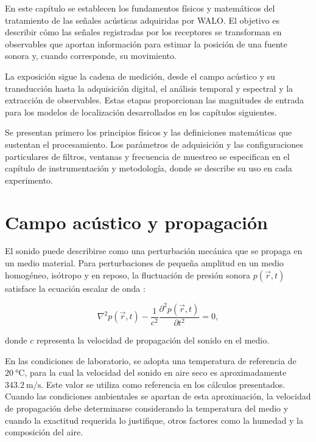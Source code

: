 \label{chap:tratamiento_campo}


En este capítulo se establecen los fundamentos físicos y matemáticos del
tratamiento de las señales acústicas adquiridas por WALO. El objetivo es
describir cómo las señales registradas por los receptores se transforman
en observables que aportan información para estimar la posición de una
fuente sonora y, cuando corresponde, su movimiento.

La exposición sigue la cadena de medición, desde el campo acústico y su
transducción hasta la adquisición digital, el análisis temporal y
espectral y la extracción de observables. Estas etapas proporcionan las
magnitudes de entrada para los modelos de localización desarrollados en
los capítulos siguientes.

Se presentan primero los principios físicos y las definiciones
matemáticas que sustentan el procesamiento. Los parámetros de adquisición
y las configuraciones particulares de filtros, ventanas y frecuencia de
muestreo se especifican en el capítulo de instrumentación y metodología,
donde se describe su uso en cada experimento.

\section{Campo acústico y propagación}

El sonido puede describirse como una perturbación mecánica que se propaga
en un medio material. Para perturbaciones de pequeña amplitud en un medio
homogéneo, isótropo y en reposo, la fluctuación de presión sonora
$p(\vec{r},t)$ satisface la ecuación escalar de onda
\cite{kinsler2000fundamentals,morse1968theoretical,pierce1989acoustics}:

\begin{equation}
    \nabla^2 p(\vec{r},t)
    -
    \frac{1}{c^2}
    \frac{\partial^2 p(\vec{r},t)}{\partial t^2}
    =0,
    \label{eq:onda_acustica}
\end{equation}

donde $c$ representa la velocidad de propagación del sonido en el medio.

En las condiciones de laboratorio, se adopta una temperatura de
referencia de $\SI{20}{\celsius}$, para la cual la velocidad del
sonido en aire seco es aproximadamente
$\SI{343.2}{\metre\per\second}$. Este valor se utiliza como
referencia en los cálculos presentados. Cuando las condiciones
ambientales se apartan de esta aproximación, la velocidad de propagación
debe determinarse considerando la temperatura del medio y cuando la
exactitud requerida lo justifique, otros factores como la humedad y la
composición del aire.

